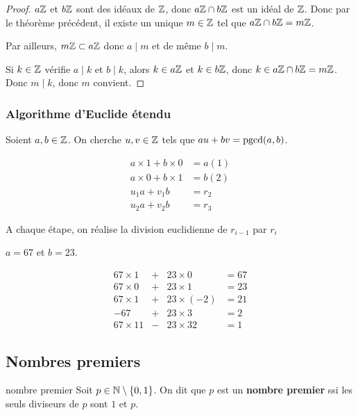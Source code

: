 \begin{proof}
    $a \mathbb{Z}$ et $b \mathbb{Z}$ sont des idéaux de $\mathbb{Z}$, donc $a \mathbb{Z} \cap b \mathbb{Z}$ est un idéal de $\mathbb{Z}$. 
    Donc par le théorème précédent, il existe un unique $m \in \mathbb{Z}$ tel que $a \mathbb{Z} \cap b \mathbb{Z} = m \mathbb{Z}$.

    Par ailleurs, $m \mathbb{Z} \subset a \mathbb{Z}$ donc $a \mid m$ et de même $b \mid m$.

    Si $k \in \mathbb{Z}$ vérifie $a \mid k$ et $b \mid k$, alors $k \in a \mathbb{Z}$ et $k \in b \mathbb{Z}$, donc
    $k \in a \mathbb{Z} \cap b \mathbb{Z} = m \mathbb{Z}$. Donc $m \mid k$, donc $m$ convient.
\end{proof}

\subsubsection{Algorithme d'Euclide étendu}

Soient $a, b \in \mathbb{Z}$. On cherche $u, v \in \mathbb{Z}$ tels que $au + bv = \operatorname{pgcd}(a, b)$.


\begin{align*}
    a \times 1 + b \times 0 & = a (1)\\
    a \times 0 + b \times 1 & = b (2)\\
    u_1 a + v_1 b & = r_2 \\
    u_2 a + v_2 b & = r_3 
\end{align*}

A chaque étape, on réalise la division euclidienne de $r_{i-1}$ par $r_i$

\begin{exemple}
    $a = 67$ et $b = 23$. 

    $$\begin{array}{rccl}
        67 \times 1 & + & 23 \times 0 & = 67 \\
        67 \times 0 & + & 23 \times 1 & = 23 \\
        67 \times 1 & + & 23 \times (-2) & = 21 \\
        -67 & + & 23 \times 3 & = 2 \\
        67 \times 11 & - & 23 \times 32 & = 1
    \end{array}$$
\end{exemple}

\subsection{Nombres premiers}

\begin{definition}{nombre premier}{}
    Soit $p \in \mathbb{N} \setminus \{0, 1\}$. On dit que $p$ est un \textbf{nombre premier} ssi
    les seuls diviseurs de $p$ sont $1$ et $p$.
\end{definition}

